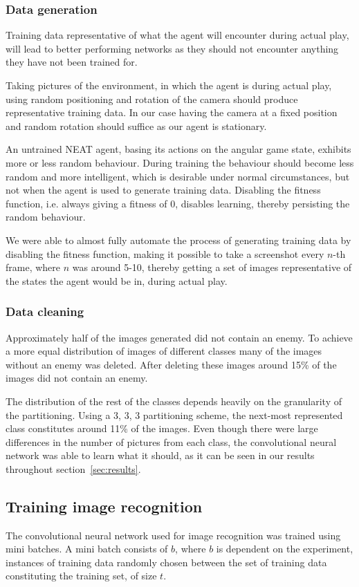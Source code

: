 \subsubsection{Data generation}
\label{subsub:data-gen}
Training data representative of what the agent will encounter during actual play, will lead to better performing networks as they should not encounter anything they have not been trained for.

Taking pictures of the environment, in which the agent is during actual play, using random positioning and rotation of the camera should produce representative training data. In our case having the camera at a fixed position and random rotation should suffice as our agent is stationary.

An untrained NEAT agent, basing its actions on the angular game state, exhibits more or less random behaviour. During training the behaviour should become less random and more intelligent, which is desirable under normal circumstances, but not when the agent is used to generate training data. Disabling the fitness function, i.e. always giving a fitness of 0, disables learning, thereby persisting the random behaviour.

We were able to almost fully automate the process of generating training data by disabling the fitness function, making it possible to take a screenshot every $n$-th frame, where $n$ was around 5-10,  thereby getting a set of images representative of the states the agent would be in, during actual play.


\subsubsection{Data cleaning}
Approximately half of the images generated did not contain an enemy. To achieve a more equal distribution of images of different classes many of the images without an enemy was deleted. After deleting these images around 15\% of the images did not contain an enemy.

The distribution of the rest of the classes depends heavily on the granularity of the partitioning. Using a 3, 3, 3 partitioning scheme, the next-most represented class constitutes around 11\% of the images. Even though there were large differences in the number of pictures from each class, the convolutional neural network was able to learn what it should, as it can be seen in our results throughout section~\ref{sec:results}.

\subsection{Training image recognition}
The convolutional neural network used for image recognition was trained using mini batches. A mini batch consists of $b$, where $b$ is dependent on the experiment, instances of training data randomly chosen between the set of training data constituting the training set, of size $t$.

